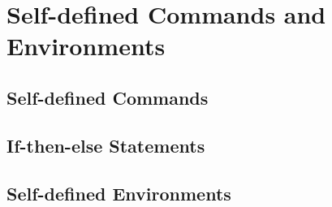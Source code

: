\chapter{Self-defined Commands and Environments}

\section{Self-defined Commands}

\section{If-then-else Statements}

\section{Self-defined Environments}